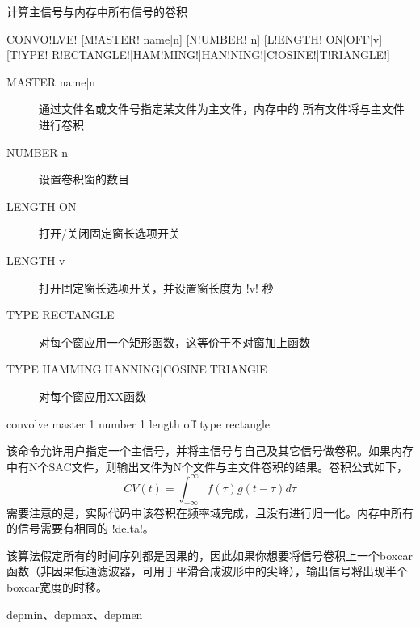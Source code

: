 \label{cmd:convolve}

计算主信号与内存中所有信号的卷积

\begin{SACSTX}
CONVO!LVE! [M!ASTER! name|n] [N!UMBER! n] [L!ENGTH! ON|OFF|v]
    [T!YPE! R!ECTANGLE!|HAM!MING!|HAN!NING!|C!OSINE!|T!RIANGLE!]
\end{SACSTX}

\begin{description}
\item [MASTER name|n] 通过文件名或文件号指定某文件为主文件，内存中的
    所有文件将与主文件进行卷积
\item [NUMBER n] 设置卷积窗的数目
\item [LENGTH ON] 打开/关闭固定窗长选项开关
\item [LENGTH v] 打开固定窗长选项开关，并设置窗长度为 !v! 秒
\item [TYPE RECTANGLE] 对每个窗应用一个矩形函数，这等价于不对窗加上函数
\item [TYPE HAMMING|HANNING|COSINE|TRIANGlE] 对每个窗应用XX函数
\end{description}

\begin{SACDFT}
convolve master 1 number 1 length off type rectangle
\end{SACDFT}

该命令允许用户指定一个主信号，并将主信号与自己及其它信号做卷积。如果内存
中有N个SAC文件，则输出文件为N个文件与主文件卷积的结果。卷积公式如下，
	\[ CV(t) = \int_{-\infty} ^\infty f(\tau)g(t-\tau)d\tau \]
需要注意的是，实际代码中该卷积在频率域完成，且没有进行归一化。内存中所有
的信号需要有相同的 !delta!。

该算法假定所有的时间序列都是因果的，因此如果你想要将信号卷积上一个boxcar
函数（非因果低通滤波器，可用于平滑合成波形中的尖峰），输出信号将出现半个
boxcar宽度的时移。

depmin、depmax、depmen
